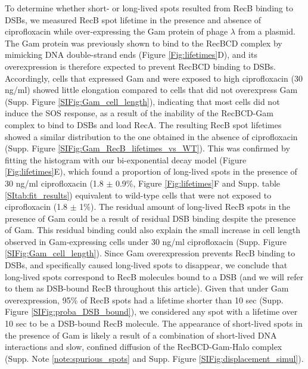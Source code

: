 To determine whether short- or long-lived spots resulted from RecB binding to DSBs, we measured RecB spot lifetime in the presence and absence of ciprofloxacin while over-expressing the Gam protein of phage $\lambda$ from a plasmid. The Gam protein was previously shown to bind to the RecBCD complex by mimicking DNA double-strand ends \cite{Wilkinson2016} (Figure \ref{Fig:lifetimes}D), and its overexpression is therefore expected to prevent RecBCD binding to DSBs. Accordingly, cells that expressed Gam and were exposed to high ciprofloxacin (30 ng/ml) showed little elongation compared to cells that did not overexpress Gam (Supp. Figure \ref{SIFig:Gam_cell_length}), indicating that most cells did not induce the SOS response, as a result of the inability of the RecBCD-Gam complex to bind to DSBs and load RecA. The resulting RecB spot lifetimes showed a similar distribution to the one obtained in the absence of ciprofloxacin (Supp. Figure \ref{SIFig:Gam_RecB_lifetimes_vs_WT}). This was confirmed by fitting the histogram with our bi-exponential decay model (Figure \ref{Fig:lifetimes}E), which found a proportion of long-lived spots in the presence of 30 ng/ml ciprofloxacin (1.8 $\pm$ 0.9\%, Figure \ref{Fig:lifetimes}F and Supp. table \ref{SItab:fit_results}) equivalent to wild-type cells that were not exposed to ciprofloxacin (1.8 $\pm$ 1\%). The residual amount of long-lived RecB spots in the presence of Gam could be a result of residual DSB binding despite the presence of Gam. This residual binding could also explain the small increase in cell length observed in Gam-expressing cells under 30 ng/ml ciprofloxacin (Supp. Figure \ref{SIFig:Gam_cell_length}). Since Gam overexpression prevents RecB binding to DSBs, and specifically caused long-lived spots to disappear, we conclude that long-lived spots correspond to RecB molecules bound to a DSB (and we will refer to them as DSB-bound RecB throughout this article). Given that under Gam overexpression, 95\% of RecB spots had a lifetime shorter than 10 sec (Supp. Figure \ref{SIFig:proba_DSB_bound}), we considered any spot with a lifetime over 10 sec to be a DSB-bound RecB molecule. The appearance of short-lived spots in the presence of Gam is likely a result of a combination of short-lived DNA interactions and slow, confined diffusion of the RecBCD-Gam-Halo complex (Supp. Note \ref{note:spurious_spots} and Supp. Figure \ref{SIFig:displacement_simul}).

